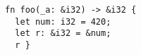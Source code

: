 \begin{lstlisting}[style=Rust,label=lst:lifetimes]
fn foo(_a: &i32) -> &i32 {
  let num: i32 = 420;
  let r: &i32 = &num;
  r }
\end{lstlisting}
